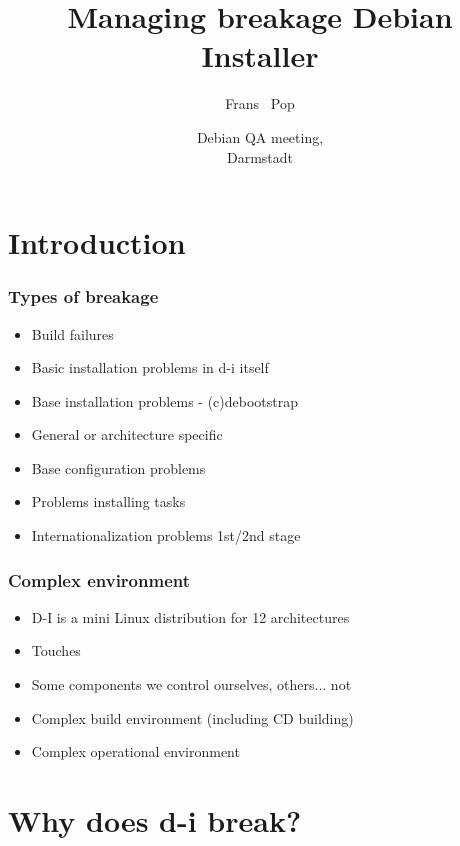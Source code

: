 \documentclass{beamer}
\title[Managing breakage in Debian Installer] %
{Managing breakage Debian Installer}
\author %
{Frans ~Pop}
\date[QA 2005] %
{Debian QA meeting,\\ Darmstadt}
\begin{document}
\begin{frame}
  \titlepage
\end{frame}



\section{Introduction}

\begin{frame}
  \frametitle{Types of breakage}
	\begin{itemize}[<+->]
	\item
		Build failures
	\item
		Basic installation problems in d-i itself
	\item
		Base installation problems - (c)debootstrap
	\item
		General or architecture specific
	\item
		Base configuration problems
	\item
		Problems installing tasks
	\item
		Internationalization problems 1st/2nd stage
	\end{itemize}
\end{frame}

\begin{frame}
  \frametitle{Complex environment}
	\begin{itemize}[<+->]
	\item
		D-I is a mini Linux distribution for 12 architectures
	\item
		Touches 
	\item
		Some components we control ourselves, others... not
	\item
		Complex build environment (including CD building)
	\item
		Complex operational environment
	\end{itemize}
\end{frame}

\section{Why does d-i break?}
\end{document}
